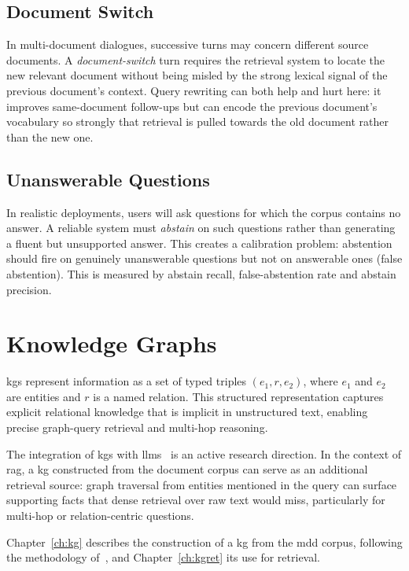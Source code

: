 \subsection{Document Switch}

In multi-document dialogues, successive turns may concern different source
documents. A \emph{document-switch} turn requires the retrieval system to locate
the new relevant document without being misled by the strong lexical signal of the
previous document's context. Query rewriting can both help and hurt here: it
improves same-document follow-ups but can encode the previous document's vocabulary
so strongly that retrieval is pulled towards the old document rather than the new one.

\subsection{Unanswerable Questions}

In realistic deployments, users will ask questions for which the corpus contains
no answer. A reliable system must \emph{abstain} on such questions rather than
generating a fluent but unsupported answer. This creates a calibration problem:
abstention should fire on genuinely unanswerable questions but not on answerable
ones (false abstention). This is measured by abstain recall, false-abstention rate
and abstain precision.


\section{Knowledge Graphs}\label{sec:bg:kg}

\Glspl{kg} represent information as a set of typed triples
$(e_1, r, e_2)$, where $e_1$ and $e_2$ are entities and $r$ is a named relation.
This structured representation captures explicit relational knowledge that is
implicit in unstructured text, enabling precise graph-query retrieval and
multi-hop reasoning.

The integration of \glspl{kg} with \glspl{llm}~\cite{pan2023unifying} is an active
research direction. In the context of \gls{rag}, a \gls{kg} constructed from the
document corpus can serve as an additional retrieval source: graph traversal from
entities mentioned in the query can surface supporting facts that dense retrieval
over raw text would miss, particularly for multi-hop or relation-centric questions.

Chapter~\ref{ch:kg} describes the construction of a \gls{kg} from the \gls{mdd}
corpus, following the methodology of~\textcite{negro2026kg}, and
Chapter~\ref{ch:kgret} its use for retrieval.

